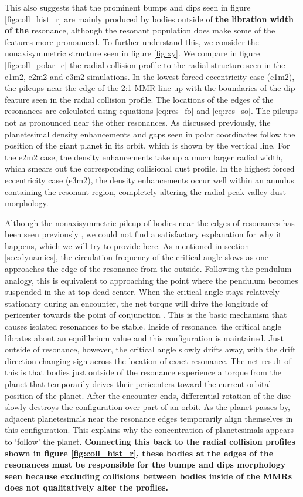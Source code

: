 \documentclass[fleqn,usenatbib]{mnras}
\begin{document}
This also suggests that the prominent bumps and dips seen in figure \ref{fig:coll_hist_r} are mainly produced by bodies outside of \textbf{the libration width of the} resonance, although 
the resonant population does make some of the features more pronounced. To further understand this, we consider the nonaxisymmetric structure 
seen in figure \ref{fig:xy}. We compare in figure \ref{fig:coll_polar_e} the radial collision profile to the radial structure seen in the e1m2, e2m2 and 
e3m2 simulations. In the lowest forced eccentricity case (e1m2), the pileups near the edge of the 2:1 MMR line up with the boundaries of the dip 
feature seen in the radial collision profile. The locations of the edges of the resonances are calculated using equations \ref{eq:res_fo} and 
\ref{eq:res_so}. The pileups not as pronounced near the other resonances. As discussed previously, the planetesimal density enhancements and gaps 
seen in polar coordinates follow the position of the giant planet in its orbit, which is shown by the vertical line. For the e2m2 case, the density 
enhancements take up a much larger radial width, which smears out the corresponding collisional dust profile. In the highest forced eccentricity case 
(e3m2), the density enhancements occur well within an annulus containing the resonant region, completely altering the radial peak-valley dust 
morphology.

Although the nonaxisymmetric pileup of bodies near the edges of resonances has been seen previously 
\citep{2000Icar..143...45R, 2016ApJ...818..159T}, we could not find a satisfactory explanation for why it happens, which we will try to provide here. As 
mentioned in section \ref{sec:dynamics}, the circulation frequency of the critical angle slows as one approaches the edge of the resonance from the 
outside. Following the pendulum analogy, this is equivalent to
approaching the point where the pendulum becomes suspended in the
at top dead center. 
When the critical angle stays relatively stationary during an encounter, the net torque will drive the longitude of pericenter towards the point of 
conjunction \citep{1976ARA&A..14..215P}.  This is the basic mechanism that causes isolated resonances to be stable. Inside of resonance, the critical 
angle librates about an equilibrium value and this configuration is maintained. Just outside of resonance, however, the critical angle slowly drifts away, with the 
drift direction changing sign across the location of exact resonance. The net result of this is that bodies just outside of the resonance experience a torque from 
the planet that temporarily drives their pericenters toward the current orbital position of the planet. After the encounter ends, differential rotation of the disc 
slowly destroys the configuration over part of an orbit. As the planet passes by, adjacent planetesimals near the resonance edges temporarily align 
themselves in this configuration. This explains why the concentration of planetesimals appears to `follow' the planet. \textbf{Connecting this back to the radial collision profiles shown in figure \ref{fig:coll_hist_r}, these bodies at the edges of the resonances must be responsible for the bumps and dips morphology seen because excluding collisions between bodies inside of the MMRs does not qualitatively alter the profiles.}
\end{document}
